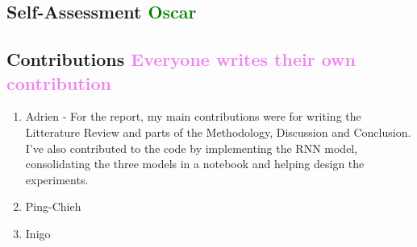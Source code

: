 \documentclass[12pt, letterpaper]{article}
\begin{document}
\subsection*{Self-Assessment \textcolor{green}{Oscar}}


\pagebreak
\subsection*{Contributions \textcolor{violet}{Everyone writes their own contribution}}
\begin{enumerate}
    \item Adrien - 
        For the report, my main contributions were for writing the Litterature Review and parts of the Methodology, Discussion and Conclusion. I've also contributed to the code by implementing the RNN model, consolidating the three models in a notebook and helping design the experiments.
    \item Ping-Chieh
    \item Inigo
\end{enumerate}
\end{document}
